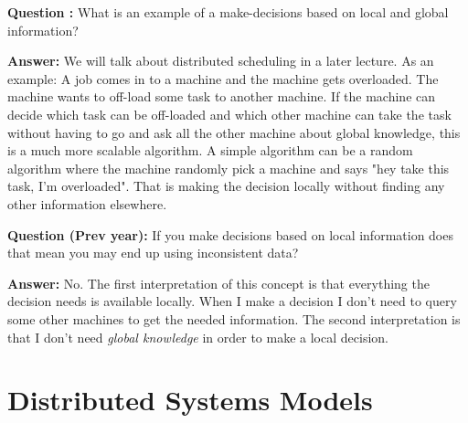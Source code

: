 \documentclass[twoside]{article}
\begin{document}
\textbf{Question :} What is an example of a make-decisions based on local and global information?

\textbf{Answer:} We will talk about distributed scheduling in a later lecture. As an example: A job comes in to a machine and the machine gets overloaded. The machine wants to off-load some task to another machine. If the machine can decide which task can be off-loaded and which other machine can take the task without having to go and ask all the other machine about global knowledge, this is a much more scalable algorithm. A simple algorithm can be a random algorithm where the machine randomly pick a machine and says "hey take this task, I'm overloaded". That is making the decision locally without finding any other information elsewhere. 


\textbf{Question (Prev year):} If you make decisions based on local information does that mean you may end up using inconsistent data?

\textbf{Answer:} No. The first interpretation of this concept is that everything the decision needs is available locally. When I make a decision I don't need to query some other machines to get the needed information. The second interpretation is that I don't need \textit{global knowledge} in order to make a local decision.


\section{Distributed Systems Models}
\end{document}

